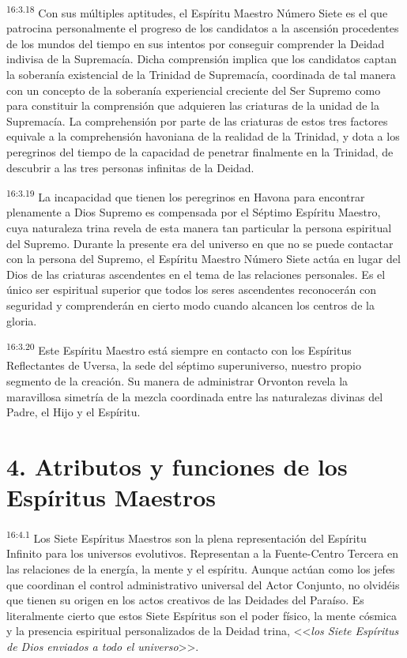 \par
\textsuperscript{16:3.18} Con sus múltiples aptitudes, el Espíritu Maestro Número Siete es el que patrocina personalmente el progreso de los candidatos a la ascensión procedentes de los mundos del tiempo en sus intentos por conseguir comprender la Deidad indivisa de la Supremacía. Dicha comprensión implica que los candidatos captan la soberanía existencial de la Trinidad de Supremacía, coordinada de tal manera con un concepto de la soberanía experiencial creciente del Ser Supremo como para constituir la comprensión que adquieren las criaturas de la unidad de la Supremacía. La comprehensión por parte de las criaturas de estos tres factores equivale a la comprehensión havoniana de la realidad de la Trinidad, y dota a los peregrinos del tiempo de la capacidad de penetrar finalmente en la Trinidad, de descubrir a las tres personas infinitas de la Deidad.

\par
\textsuperscript{16:3.19} La incapacidad que tienen los peregrinos en Havona para encontrar plenamente a Dios Supremo es compensada por el Séptimo Espíritu Maestro, cuya naturaleza trina revela de esta manera tan particular la persona espiritual del Supremo. Durante la presente era del universo en que no se puede contactar con la persona del Supremo, el Espíritu Maestro Número Siete actúa en lugar del Dios de las criaturas ascendentes en el tema de las relaciones personales. Es el único ser espiritual superior que todos los seres ascendentes reconocerán con seguridad y comprenderán en cierto modo cuando alcancen los centros de la gloria.

\par
\textsuperscript{16:3.20} Este Espíritu Maestro está siempre en contacto con los Espíritus Reflectantes de Uversa, la sede del séptimo superuniverso, nuestro propio segmento de la creación. Su manera de administrar Orvonton revela la maravillosa simetría de la mezcla coordinada entre las naturalezas divinas del Padre, el Hijo y el Espíritu.

\section*{4. Atributos y funciones de los Espíritus Maestros}
\par
\textsuperscript{16:4.1} Los Siete Espíritus Maestros son la plena representación del Espíritu Infinito para los universos evolutivos. Representan a la Fuente-Centro Tercera en las relaciones de la energía, la mente y el espíritu. Aunque actúan como los jefes que coordinan el control administrativo universal del Actor Conjunto, no olvidéis que tienen su origen en los actos creativos de las Deidades del Paraíso. Es literalmente cierto que estos Siete Espíritus son el poder físico, la mente cósmica y la presencia espiritual personalizados de la Deidad trina, <<\textit{los Siete Espíritus de Dios enviados a todo el universo}>>.

